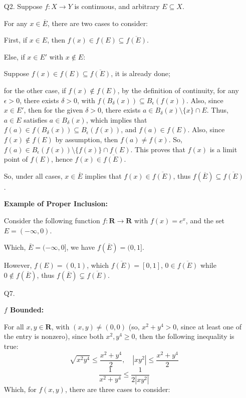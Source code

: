 \documentclass{article}
\begin{document}
\break

\begin{itemize}
    \item[Q2.] Suppose $f:X\rightarrow Y$ is continuous, and arbitrary $E\subseteq X$.
    
    For any $x\in \overline{E}$, there are two cases to consider: 
    
    First, if $x\in E$, then $f(x)\in f(E) \subseteq \overline{f(E)}$.

    Else, if $x\in E'$ with $x\notin E$: 
    
    Suppose $f(x)\in f(E) \subseteq \overline{f(E)}$, it is already done; 
    
    for the other case, if $f(x) \notin f(E)$, by the definition of continuity, for any $\epsilon>0$, there exists $\delta>0$,
    with $f(B_\delta(x)) \subseteq B_\epsilon(f(x))$. Also, since $x\in E'$, then for the given $\delta>0$, there exists $a\in B_\delta(x)\setminus\{x\} \cap E$.
    Thus, $a\in E$ satisfies $a\in B_\delta(x)$, which implies that $f(a)\in f(B_\delta(x)) \subseteq B_\epsilon(f(x))$, and $f(a)\in f(E)$. 
    Also, since $f(x)\notin f(E)$ by assumption, then $f(a)\neq f(x)$. So, $f(a)\in B_\epsilon(f(x))\setminus\{f(x)\}\cap f(E)$.
    This proves that $f(x)$ is a limit point of $f(E)$, hence $f(x)\in \overline{f(E)}$.

    So, under all cases, $x\in \overline{E}$ implies that $f(x)\in \overline{f(E)}$, thus $f(\overline{E}) \subseteq \overline{f(E)}$.

    \hfill

    \textbf{Example of Proper Inclusion:}
    
    Consider the following function $f:\mathbf{R}\rightarrow\mathbf{R}$ with $f(x)=e^x$, and the set $E=(-\infty,0)$.

    Which, $\overline{E}=(-\infty,0]$, we have $f(\overline{E})=(0,1]$.

    However, $f(E)=(0,1)$, which $\overline{f(E)}=[0,1]$, $0\in \overline{f(E)}$ while $0\notin f(\overline{E})$, thus $f(\overline{E}) \subsetneq \overline{f(E)}$.

    \break

    \item[Q7.]
    
    \textbf{$f$ Bounded:} 

    For all $x,y\in \mathbf{R}$, with $(x,y)\neq(0,0)$ (so, $x^2+y^4 >0$, since at least one of the entry is nonzero), since both $x^2, y^4 \geq 0$, then the following inequality is true:
    $$\sqrt{x^2y^4} \leq \frac{x^2+y^4}{2},\quad |xy^2| \leq \frac{x^2+y^4}{2}$$
    $$\frac{1}{x^2+y^4}\leq \frac{1}{2|xy^2|}$$
    Which, for $f(x,y)$, there are three cases to consider:
    

\end{itemize}
\end{document}
